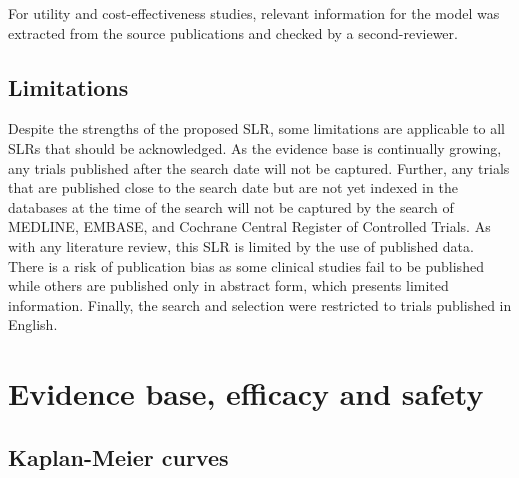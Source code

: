 \documentclass[11pt,final,fleqn]{article}\usepackage[]{graphicx}\usepackage[]{color}
\theoremstyle{plain}
\begin{document}
\begin{appendices}
For utility and cost-effectiveness studies, relevant information for the model was extracted from the source publications and checked by a second-reviewer. 

\subsection{Limitations}
Despite the strengths of the proposed SLR, some limitations are applicable to all SLRs that should be acknowledged. As the evidence base is continually growing, any trials published after the search date will not be captured. Further, any trials that are published close to the search date but are not yet indexed in the databases at the time of the search will not be captured by the search of MEDLINE, EMBASE, and Cochrane Central Register of Controlled Trials. As with any literature review, this SLR is limited by the use of published data. There is a risk of publication bias as some clinical studies fail to be published while others are published only in abstract form, which presents limited information. Finally, the search and selection were restricted to trials published in English.

\section{Evidence base, efficacy and safety}

\subsection{Kaplan-Meier curves} \label{app:km-curves}

\end{appendices}
\end{document}

